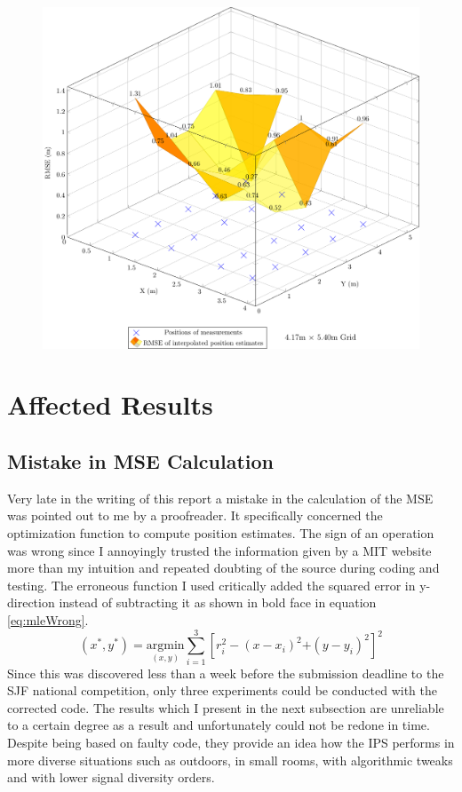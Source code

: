 \documentclass[a4paper, oneside]{ipsreport}
\begin{document}
\begin{figure}[H]
	\centering
	\includegraphics[width=0.8\linewidth]{./figures/rmse/rearrangedBeacons.pdf}
	\label{fig:rearrangedBeacons}
\end{figure}

\section{Affected Results}
\subsection{Mistake in MSE Calculation}
Very late in the writing of this report a mistake in the calculation of the MSE was pointed out to me by a proofreader. It specifically concerned the optimization function to compute position estimates. The sign of an operation was wrong since I annoyingly trusted the information given by a MIT website \autocite{localizationMIT} more than my intuition and repeated doubting of the source during coding and testing. The erroneous function I used critically added the squared error in y-direction instead of subtracting it as shown in bold face in equation \ref{eq:mleWrong}.
\begin{equation}
	\label{eq:mleWrong}
	(x^*, y^*) = \underset{(x,y)}{\mathrm{argmin}}\sum_{i=1}^3 [r_i^2 - (x - x_i)^2 \textbf{+} (y - y_i)^2]^2
\end{equation}
Since this was discovered less than a week before the submission deadline to the SJF national competition, only three experiments could be conducted with the corrected code. The results which I present in the next subsection are unreliable to a certain degree as a result and unfortunately could not be redone in time. Despite being based on faulty code, they provide an idea how the IPS performs in more diverse situations such as outdoors, in small rooms, with algorithmic tweaks and with lower signal diversity orders.
\end{document}
